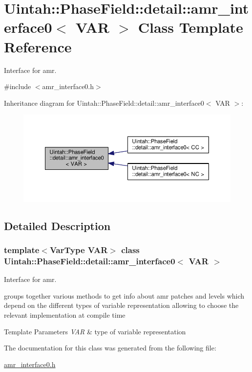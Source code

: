 \hypertarget{classUintah_1_1PhaseField_1_1detail_1_1amr__interface0}{}\section{Uintah\+:\+:Phase\+Field\+:\+:detail\+:\+:amr\+\_\+interface0$<$ V\+AR $>$ Class Template Reference}
\label{classUintah_1_1PhaseField_1_1detail_1_1amr__interface0}


Interface for amr.  




{\ttfamily \#include $<$amr\+\_\+interface0.\+h$>$}



Inheritance diagram for Uintah\+:\+:Phase\+Field\+:\+:detail\+:\+:amr\+\_\+interface0$<$ V\+AR $>$\+:\nopagebreak
\begin{figure}[H]
\begin{center}
\leavevmode
\includegraphics[width=350pt]{classUintah_1_1PhaseField_1_1detail_1_1amr__interface0__inherit__graph}
\end{center}
\end{figure}


\subsection{Detailed Description}
\subsubsection*{template$<$Var\+Type V\+AR$>$\newline
class Uintah\+::\+Phase\+Field\+::detail\+::amr\+\_\+interface0$<$ V\+A\+R $>$}

Interface for amr. 

groups together various methods to get info about amr patches and levels which depend on the different types of variable representation allowing to choose the relevant implementation at compile time


\begin{DoxyTemplParams}{Template Parameters}
{\em V\+AR} & type of variable representation \\
\hline
\end{DoxyTemplParams}


The documentation for this class was generated from the following file\+:\begin{DoxyCompactItemize}
\item 
\hyperlink{amr__interface0_8h}{amr\+\_\+interface0.\+h}\end{DoxyCompactItemize}
